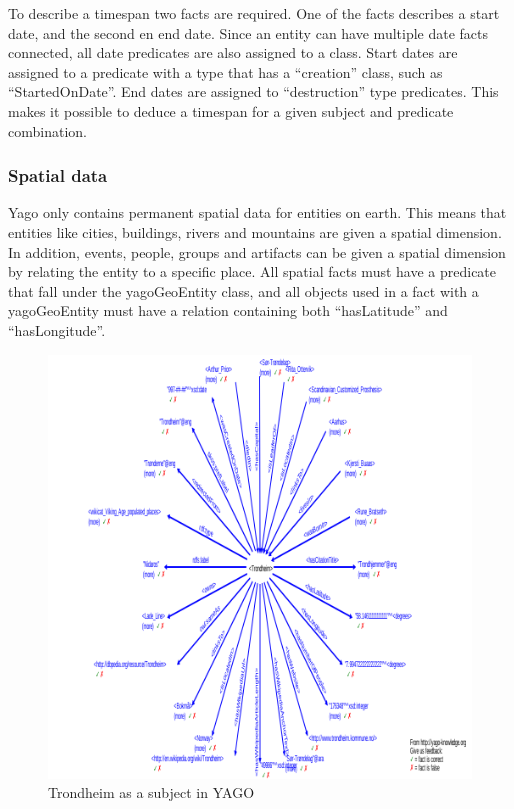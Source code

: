 To describe a timespan two facts are required. One of the facts describes a start date, and the second en end date. Since an entity can have multiple date facts connected, all date predicates are also assigned to a class. Start dates are assigned to a predicate with a type that has a ``creation'' class, such as ``StartedOnDate''. End dates are assigned to ``destruction'' type predicates. This makes it possible to deduce a timespan for a given subject and predicate combination.\cite{yago}\\

\subsubsection{Spatial data}
Yago only contains permanent spatial data for entities on earth. This means that entities like cities, buildings, rivers and mountains are given a spatial dimension. In addition, events, people, groups and artifacts can be given a spatial dimension by relating the entity to a specific place. All spatial facts must have a predicate that fall under the yagoGeoEntity class, and all objects used in a fact with a yagoGeoEntity must have a relation containing both ``hasLatitude'' and ``hasLongitude''.


\begin{figure}[t]
  \centering
  \includegraphics[scale=0.3]{fig/yago_trondheim.png}
 \caption{Trondheim as a subject in YAGO}
 \label{fig:1}
\end{figure}


